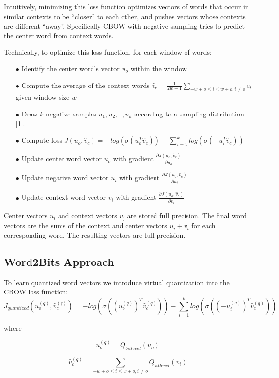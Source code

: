 \documentclass{article} %
\begin{document}
Intuitively, minimizing this loss function optimizes vectors of
words that occur in similar contexts to be ``closer'' to each other,
and pushes vectors whose contexts are different ``away''. Specifically CBOW with negative sampling tries to predict the
center word from context words.

Technically, to optimize this loss function, for each window of words:

\begin{enumerate}

\item[$\bullet$] Identify the center word's vector $u_o$ within the window
\item[$\bullet$] Compute the average of the context words $\hat{v}_c = \frac{1}{2w-1} \sum_{-w+o \leq i \leq w+o, i \neq o} v_i$ given window size $w$
\item[$\bullet$] Draw $k$ negative samples $u_1, u_2, .., u_k$ according to a sampling distribution [1].
\item[$\bullet$] Compute loss $J(u_o, \hat{v}_c) = -log(\sigma(u_o^T\hat{v}_c)) - \sum_{i=1}^{k} log(\sigma(-u_i^T\hat{v}_c))$
\item[$\bullet$] Update center word vector $u_o$ with gradient $\frac{\partial J(u_o, \hat{v}_c)}{\partial u_o}$
\item[$\bullet$] Update negative word vector $u_i$ with gradient $\frac{\partial J(u_o, \hat{v}_c)}{\partial u_i}$
\item[$\bullet$] Update context word vector $v_i$ with gradient $\frac{\partial J(u_o, \hat{v}_c)}{\partial v_i}$
\end{enumerate}

Center vectors $u_i$ and context vectors $v_j$ are stored full
precision. The final word vectors are the sums of the context and
center vectors $u_i + v_i$ for each corresponding word. The resulting
vectors are full precision.

\subsection{Word2Bits Approach}
To learn quantized word vectors we introduce virtual quantization into the CBOW loss function:
$$
J_{quantized}(u^{(q)}_o, \hat{v}^{(q)}_c) = -log(\sigma((u^{(q)}_{o})^{T} \hat{v}^{(q)}_c)) - \sum_{i=1}^{k} log(\sigma((-u^{(q)}_i)^T\hat{v}^{(q)}_c))
$$

where

$$
u^{(q)}_o = Q_{bitlevel}(u_o)
$$

$$
\hat{v}^{(q)}_c = \sum_{-w+o \leq i \leq w+o,i \neq o} Q_{bitlevel}(v_i)
$$
\end{document}
